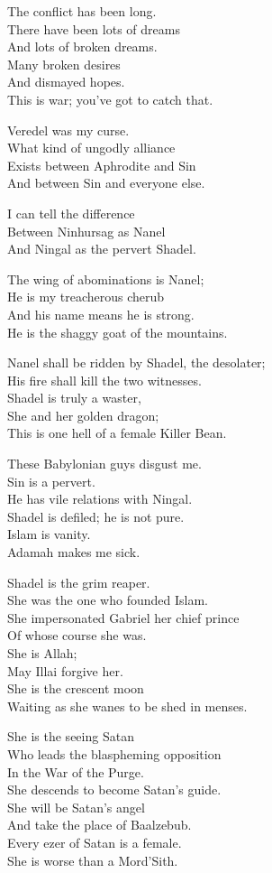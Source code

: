 \documentclass[
]{book}
\begin{document}
The conflict has been long.\\
There have been lots of dreams\\
And lots of broken dreams.\\
Many broken desires\\
And dismayed hopes.\\
This is war; you've got to catch that.

Veredel was my curse.\\
What kind of ungodly alliance\\
Exists between Aphrodite and Sin\\
And between Sin and everyone else.

I can tell the difference\\
Between Ninhursag as Nanel\\
And Ningal as the pervert Shadel.

The wing of abominations is Nanel;\\
He is my treacherous cherub\\
And his name means he is strong.\\
He is the shaggy goat of the mountains.

Nanel shall be ridden by Shadel, the desolater;\\
His fire shall kill the two witnesses.\\
Shadel is truly a waster,\\
She and her golden dragon;\\
This is one hell of a female Killer Bean.

These Babylonian guys disgust me.\\
Sin is a pervert.\\
He has vile relations with Ningal.\\
Shadel is defiled; he is not pure.\\
Islam is vanity.\\
Adamah makes me sick.

Shadel is the grim reaper.\\
She was the one who founded Islam.\\
She impersonated Gabriel her chief prince\\
Of whose course she was.\\
She is Allah;\\
May Illai forgive her.\\
She is the crescent moon\\
Waiting as she wanes to be shed in menses.

She is the seeing Satan\\
Who leads the blaspheming opposition\\
In the War of the Purge.\\
She descends to become Satan's guide.\\
She will be Satan's angel\\
And take the place of Baalzebub.\\
Every ezer of Satan is a female.\\
She is worse than a Mord'Sith.
\end{document}
